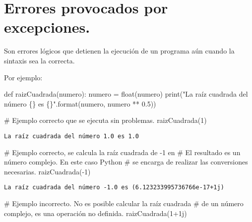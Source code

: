 \documentclass[
  letterpaper,
  DIV=11,
  numbers=noendperiod]{scrreprt}
\newenvironment{Shaded}{\begin{snugshade}}{\end{snugshade}}
\newcommand{\BuiltInTok}[1]{\textcolor[rgb]{0.00,0.23,0.31}{#1}}
\newcommand{\CommentTok}[1]{\textcolor[rgb]{0.37,0.37,0.37}{#1}}
\newcommand{\DecValTok}[1]{\textcolor[rgb]{0.68,0.00,0.00}{#1}}
\newcommand{\FloatTok}[1]{\textcolor[rgb]{0.68,0.00,0.00}{#1}}
\newcommand{\KeywordTok}[1]{\textcolor[rgb]{0.00,0.23,0.31}{#1}}
\newcommand{\NormalTok}[1]{\textcolor[rgb]{0.00,0.23,0.31}{#1}}
\newcommand{\OperatorTok}[1]{\textcolor[rgb]{0.37,0.37,0.37}{#1}}
\newcommand{\OtherTok}[1]{\textcolor[rgb]{0.00,0.23,0.31}{#1}}
\newcommand{\SpecialCharTok}[1]{\textcolor[rgb]{0.37,0.37,0.37}{#1}}
\newcommand{\StringTok}[1]{\textcolor[rgb]{0.13,0.47,0.30}{#1}}
\begin{document}
\section{Errores provocados por
excepciones.}\label{errores-provocados-por-excepciones.}

Son errores lógicos que detienen la ejecución de un programa aún cuando
la sintaxis sea la correcta.

Por ejemplo:

\begin{Shaded}
\begin{Highlighting}[]
\KeywordTok{def}\NormalTok{ raizCuadrada(numero):}
\NormalTok{    numero }\OperatorTok{=} \BuiltInTok{float}\NormalTok{(numero)}
    \BuiltInTok{print}\NormalTok{(}\StringTok{"La raíz cuadrada del número }\SpecialCharTok{\{\}}\StringTok{ es }\SpecialCharTok{\{\}}\StringTok{"}\NormalTok{.}\BuiltInTok{format}\NormalTok{(numero, numero }\OperatorTok{**} \FloatTok{0.5}\NormalTok{))}
\end{Highlighting}
\end{Shaded}

\begin{Shaded}
\begin{Highlighting}[]
\CommentTok{\# Ejemplo correcto que se ejecuta sin problemas.}
\NormalTok{raizCuadrada(}\DecValTok{1}\NormalTok{)}
\end{Highlighting}
\end{Shaded}

\begin{verbatim}
La raíz cuadrada del número 1.0 es 1.0
\end{verbatim}

\begin{Shaded}
\begin{Highlighting}[]
\CommentTok{\# Ejemplo correcto, se calcula la raíz cuadrada de {-}1 en}
\CommentTok{\# El resultado es un número complejo. En este caso Python}
\CommentTok{\# se encarga de realizar las conversiones necesarias.}
\NormalTok{raizCuadrada(}\OperatorTok{{-}}\DecValTok{1}\NormalTok{)}
\end{Highlighting}
\end{Shaded}

\begin{verbatim}
La raíz cuadrada del número -1.0 es (6.123233995736766e-17+1j)
\end{verbatim}

\begin{Shaded}
\begin{Highlighting}[]
\CommentTok{\# Ejemplo incorrecto. No es posible calcular la raíz cuadrada}
\CommentTok{\# de un número complejo, es una operación no definida.}
\NormalTok{raizCuadrada(}\DecValTok{1}\OperatorTok{+}\OtherTok{1j}\NormalTok{)}
\end{Highlighting}
\end{Shaded}
\end{document}
